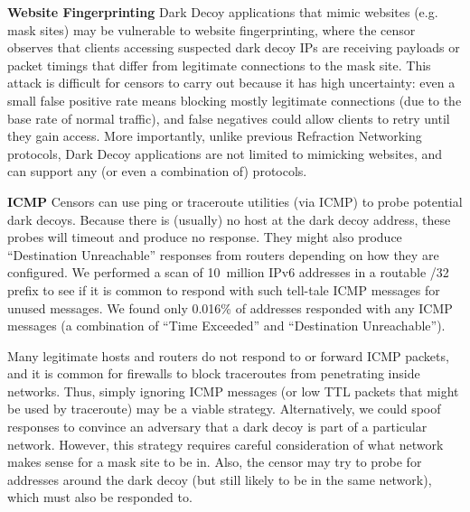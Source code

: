 \documentclass[letterpaper,twocolumn,10pt]{article}
\renewcommand{\paragraph}[1]{\smallskip\noindent\textbf{#1\quad}}
\begin{document}
\paragraph{Website Fingerprinting}
Dark Decoy applications that mimic websites (e.g. mask sites) may be vulnerable
to website fingerprinting, where the censor observes that clients accessing
suspected dark decoy IPs are receiving payloads or packet timings that differ
from legitimate connections to the mask site. This attack is difficult for
censors to carry out because it has high uncertainty: even a small false
positive rate means blocking mostly legitimate connections (due to the base rate
of normal traffic), and false negatives could allow clients to retry until they
gain access. More importantly, unlike previous Refraction Networking protocols,
Dark Decoy applications are not limited to mimicking websites, and can support
any (or even a combination of) protocols.




\paragraph{ICMP}
Censors can use ping or traceroute utilities (via ICMP) to probe potential dark
decoys. Because there is (usually) no host at the dark decoy address, these
probes will timeout and produce no response. They might also produce
``Destination Unreachable'' responses from routers depending on how they are
configured. We performed a scan of 10~million IPv6 addresses in a routable /32
prefix to see if it is common to respond with such tell-tale ICMP messages for
unused messages. We found only 0.016\% of addresses responded with any ICMP
messages (a combination of ``Time Exceeded'' and ``Destination Unreachable'').

Many legitimate hosts and routers do not respond to or forward ICMP packets, and
it is common for firewalls to block traceroutes from penetrating inside
networks. Thus, simply ignoring ICMP messages (or low TTL packets that might be
used by traceroute) may be a viable strategy. %
Alternatively, we could spoof responses to convince an adversary that a dark
decoy is part of a particular network. However, this strategy requires careful
consideration of what network makes sense for a mask site to be in. Also, the
censor may try to probe for addresses around the dark decoy (but still likely to
be in the same network), which must also be responded to.
\end{document}
